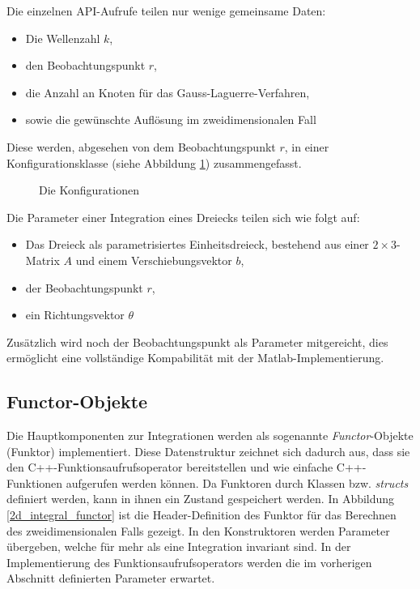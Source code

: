 Die einzelnen API-Aufrufe teilen nur wenige gemeinsame Daten:
\begin{itemize}
    \item Die Wellenzahl $k$,
    \item den Beobachtungspunkt $r$,
    \item die Anzahl an Knoten für das Gauss-Laguerre-Verfahren,
    \item sowie die gewünschte Auflösung im zweidimensionalen Fall
\end{itemize}
Diese werden, abgesehen von dem Beobachtungspunkt $r$, in einer Konfigurationsklasse (siehe Abbildung \ref{configuration}) zusammengefasst.

\begin{figure}
    
    \caption{Die Konfigurationen}\label{configuration}
\end{figure}


Die Parameter einer Integration eines Dreiecks teilen sich wie folgt auf:

\begin{itemize}
    \item Das Dreieck als parametrisiertes Einheitsdreieck, bestehend aus einer $2\times 3$-Matrix $A$ und einem Verschiebungsvektor $b$,
    \item der Beobachtungspunkt $r$,
    \item ein Richtungsvektor $\theta$
\end{itemize}

Zusätzlich wird noch der Beobachtungspunkt als Parameter mitgereicht, dies ermöglicht eine vollständige Kompabilität mit der Matlab-Implementierung.

\subsection{Functor-Objekte}\label{sec_functor}

Die Hauptkomponenten zur Integrationen werden als sogenannte \textit{Functor}-Objekte (Funktor) implementiert.
Diese Datenstruktur zeichnet sich dadurch aus, dass sie den C++-Funktionsaufrufsoperator bereitstellen und wie einfache C++-Funktionen aufgerufen werden können.
Da Funktoren durch Klassen bzw. \textit{structs} definiert werden, kann in ihnen ein Zustand gespeichert werden.
In Abbildung \ref{2d_integral_functor} ist die Header-Definition des Funktor für das Berechnen des zweidimensionalen Falls gezeigt.
In den Konstruktoren werden Parameter übergeben, welche für mehr als eine Integration invariant sind. In der Implementierung des Funktionsaufrufsoperators werden die im vorherigen Abschnitt definierten Parameter erwartet.

\begin{center}
    
    \label{2d_integral_functor}
\end{center}